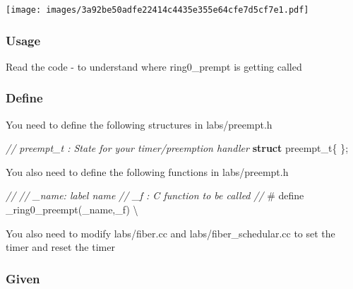 \documentclass[]{book}
\newenvironment{Shaded}{}{}
\newcommand{\KeywordTok}[1]{\textbf{{#1}}}
\newcommand{\CommentTok}[1]{\textcolor[rgb]{0.50,0.50,0.50}{\textit{{#1}}}}
\newcommand{\OtherTok}[1]{{#1}}
\newcommand{\NormalTok}[1]{{#1}}
\begin{document}
\texttt{[image: images/3a92be50adfe22414c4435e355e64cfe7d5cf7e1.pdf]}

\subsubsection*{Usage}\label{usage-7}

Read the code - to understand where ring0\_prempt is getting called

\subsubsection*{Define}\label{define-7}

You need to define the following structures in labs/preempt.h

\begin{Shaded}
\begin{Highlighting}[]
   \CommentTok{// preempt_t : State for your timer/preemption handler}
   \KeywordTok{struct} \NormalTok{preempt_t\{}
   \NormalTok{\};}
\end{Highlighting}
\end{Shaded}

You also need to define the following functions in labs/preempt.h

\begin{Shaded}
\begin{Highlighting}[]
   \CommentTok{//}
   \CommentTok{// _name: label name}
   \CommentTok{// _f   : C function to be called}
   \CommentTok{//}
   \OtherTok{#  define  _ring0_preempt(_name,_f)            \textbackslash{}}
\end{Highlighting}
\end{Shaded}

You also need to modify labs/fiber.cc and labs/fiber\_schedular.cc to
set the timer and reset the timer

\subsubsection*{Given}\label{given-7}
\end{document}
